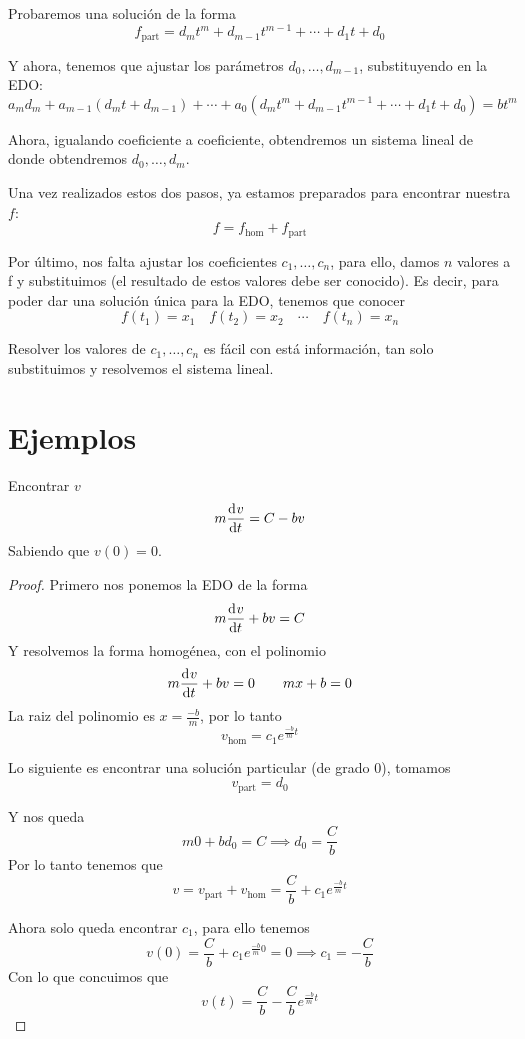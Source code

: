 \documentclass[a4paper]{article}
\newcommand{\dv}[3][]{\frac{\dif^{#1} #2}{\dif #3^{#1}}}
\begin{document}
Probaremos una solución de la forma
\[
  f_{\text{part}} = d_m t^m + d_{m-1} t^{m-1} + \cdots + d_1 t + d_0 
\]

Y ahora, tenemos que ajustar los parámetros $d_0, \dots, d_{m-1}$,
substituyendo en la EDO:
\[
  a_m d_m + a_{m-1} \left( d_m t + d_{m-1} \right) + \cdots +
  a_{0} \left( d_m t^m + d_{m-1} t^{m-1} + \cdots + d_1 t + d_0 \right) = b t^m
\]

Ahora, igualando coeficiente a coeficiente, obtendremos un sistema lineal de donde
obtendremos $d_0, \dots, d_m$.

Una vez realizados estos dos pasos, ya estamos preparados para encontrar nuestra $f$:
\[
  f = f_{\text{hom}} + f_{\text{part}}
\]

Por último, nos falta ajustar los coeficientes $c_1, \dots, c_n$, para ello, damos $n$
valores a f y substituimos (el resultado de estos valores debe ser conocido). Es decir,
para poder dar una solución única para la EDO, tenemos que conocer
\[
  f(t_1) = x_1 \quad f(t_2) = x_2 \quad \cdots \quad f(t_n) = x_n
\]

Resolver los valores de $c_1, \dots, c_n$ es fácil con está información, tan solo
substituimos y resolvemos el sistema lineal.

\section{Ejemplos}

\begin{example}
  Encontrar $v$
  \[
    m \dv{v}{t} = C - bv
  \]
  Sabiendo que $v(0) = 0$.
\end{example}
\begin{proof}
  Primero nos ponemos la EDO de la forma
  \[
    m \dv{v}{t} + bv = C
  \]
  Y resolvemos la forma homogénea, con el polinomio
  \[
    m \dv{v}{t} + bv = 0 \qquad m x + b = 0
  \]
  La raiz del polinomio es $x = \frac{-b}{m}$, por lo tanto
  \[
    v_{\text{hom}} = c_1 e^{\frac{-b}{m} t}
  \]

  Lo siguiente es encontrar una solución particular (de grado 0), tomamos
  \[
    v_{\text{part}} = d_0
  \]

  Y nos queda
  \[
    m 0 + b d_0 = C \implies d_0 = \frac{C}{b}
  \]
  Por lo tanto tenemos que
  \[
    v = v_{\text{part}} + v_{\text{hom}} = \frac{C}{b} + c_1 e^{\frac{-b}{m} t}
  \]

  Ahora solo queda encontrar $c_1$, para ello tenemos
  \[
    v(0) = \frac{C}{b} + c_1 e^{\frac{-b}{m} 0} = 0 \implies c_1 = -\frac{C}{b}
  \]
  Con lo que concuimos que 
  \[
    v(t) = \frac{C}{b} - \frac{C}{b} e^{\frac{-b}{m} t}
  \]
\end{proof}
\end{document}

